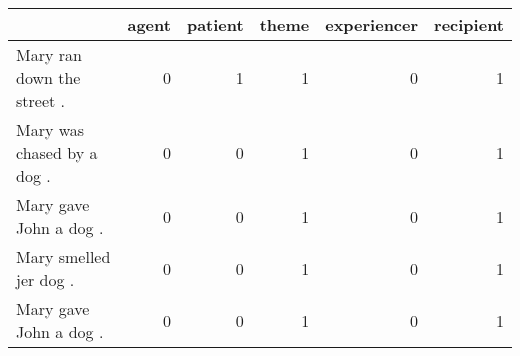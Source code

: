\begin{tabular}{lrrrrr}
\toprule
{} &  agent &  patient &  theme &  experiencer &  recipient \\
\midrule
Mary ran down the street . &      0 &        1 &      1 &            0 &          1 \\
Mary was chased by a dog . &      0 &        0 &      1 &            0 &          1 \\
Mary gave John a dog .     &      0 &        0 &      1 &            0 &          1 \\
Mary smelled jer dog .     &      0 &        0 &      1 &            0 &          1 \\
Mary gave John a dog .     &      0 &        0 &      1 &            0 &          1 \\
\bottomrule
\end{tabular}
